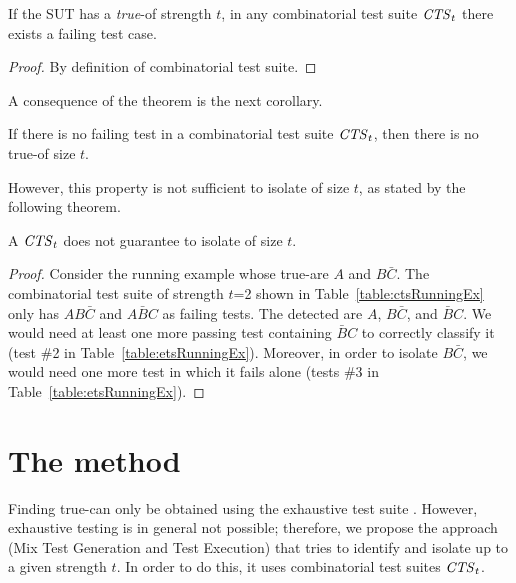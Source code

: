 \begin{tikzborder}{\cite{Gargantini16:validation}}
\begin{tikzborder}{\cite{gargantini_combinatorial_2017}}
\begin{tikzborder}{\cite{garn2019}}
\begin{tikzborder}{\cite{arcaini2019achieving}}
\begin{tikzborder}{}
\begin{thm}\label{thm:trueMficCTSt}
	If the SUT has a \emph{true}-\mfic of strength $t$, in any combinatorial test suite $\mathit{CTS}_t$ there exists a failing test case.
\end{thm}

\begin{proof}
	By definition of combinatorial test suite.
\end{proof}

A consequence of the theorem is the next corollary.

\begin{corollary}
	If there is no failing test in a combinatorial test suite $\mathit{CTS}_t$, then there is no true-\mfic of size $t$.
\end{corollary}

However, this property is not sufficient to isolate \mfics of size $t$, as stated by the following theorem.

\begin{thm}\label{thm:insufficientAccuracyCTSt}
	A $\mathit{CTS}_t$ does not guarantee to isolate \mfics of size $t$.
\end{thm}

\begin{proof}
	Consider the running example whose true-\mfics are $A$ and $B\bar{C}$. The combinatorial test suite of strength $t$=2 shown in Table~\ref{table:ctsRunningEx} only has $AB\bar{C}$ and $A\bar{B}C$ as failing tests.
	The detected \mfics are $A$, $B\bar{C}$, and $\bar{B}C$. We would need at least one more passing test containing $\bar{B}C$ to correctly classify it (test \#2 in Table~\ref{table:etsRunningEx}). Moreover, in order to isolate $B\bar{C}$, we would need one more test in which it fails alone (tests \#3 in Table~\ref{table:etsRunningEx}).
\end{proof}

\end{tikzborder}
\section{The \mix method}\label{sec:proposedApproach}
\begin{tikzborder}{}	

Finding true-\mfics can only be obtained using the exhaustive test suite \ets. However, exhaustive testing is in general not possible; therefore, we propose the approach \mix (Mix Test Generation and Test Execution) that tries to identify and isolate \mfics up to a given strength $t$. In order to do this, it uses combinatorial test suites $\mathit{CTS}_t$.


\end{tikzborder}
\end{tikzborder}
\end{tikzborder}
\end{tikzborder}
\end{tikzborder}
